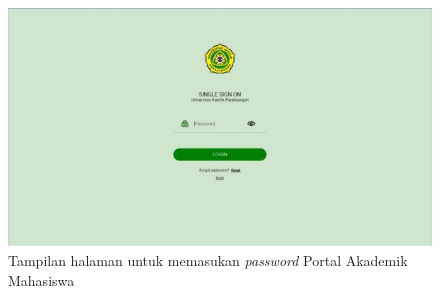 \begin{enumerate}
\begin{itemize}
		\begin{figure}[H]
			\centering
			\includegraphics[scale=0.7]{Gambar/pass2018.jpg}
			\caption{Tampilan halaman untuk memasukan \textit{password} Portal Akademik Mahasiswa} 
			\label{fig:pass_2018}
		\end{figure}
		

\end{itemize}
\end{enumerate}
